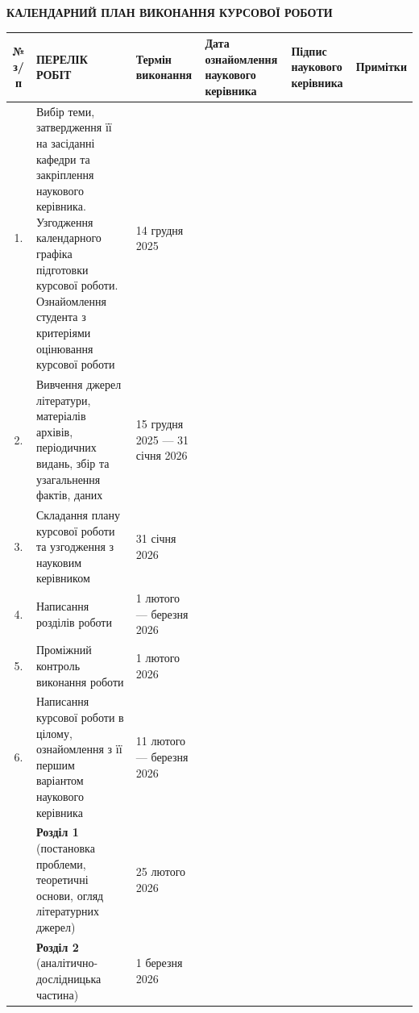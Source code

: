 \begin{landscape}
\begin{center}
    \textbf{КАЛЕНДАРНИЙ ПЛАН ВИКОНАННЯ КУРСОВОЇ РОБОТИ}\\[1em]
    \begin{singlespace}
    \small
    \renewcommand{\arraystretch}{1.1}
    \begin{tabular}{|c|p{14cm}|p{3cm}|p{2.5cm}|p{2cm}|p{2.25cm}|}
        \hline
        № з/п & 
        ПЕРЕЛІК РОБІТ & 
        Термін виконання & 
        \raggedright Дата ознайомлення наукового керівника & 
        \raggedright Підпис наукового керівника & 
        Примітки \\
        \hline
        1. & Вибір теми, затвердження її на засіданні кафедри та закріплення наукового керівника.\newline
        Узгодження календарного графіка підготовки курсової роботи.\newline
        Ознайомлення студента з критеріями оцінювання курсової роботи &
        \raggedright 14 грудня 2025 & & & \\
        \hline
        2. & Вивчення джерел літератури, матеріалів архівів, періодичних видань, збір та узагальнення фактів, даних &
        \raggedright 15 грудня 2025 --- 31 січня 2026 & & & \\
        \hline
        3. & Складання плану курсової роботи та узгодження з науковим керівником &
        31 січня 2026 & & & \\
        \hline
        4. & Написання розділів роботи &
        1 лютого --- \newline 10 березня 2026 & & & \\
        \hline
        5. & Проміжний контроль виконання роботи &
        1 лютого 2026 & & & \\
        \hline
        6. & Написання курсової роботи в цілому, ознайомлення з її першим варіантом наукового керівника &
        11 лютого --- \newline 10 березня 2026 & & & \\
        \hline
        & \textbf{Розділ 1}\newline
        (постановка проблеми, теоретичні основи, огляд літературних джерел) &
        25 лютого 2026 & & & \\
        \hline
        & \textbf{Розділ 2}\newline
        (аналітично-дослідницька частина) &
        1 березня 2026 & & & \\

\end{tabular}
\end{singlespace}
\end{center}
\end{landscape}
